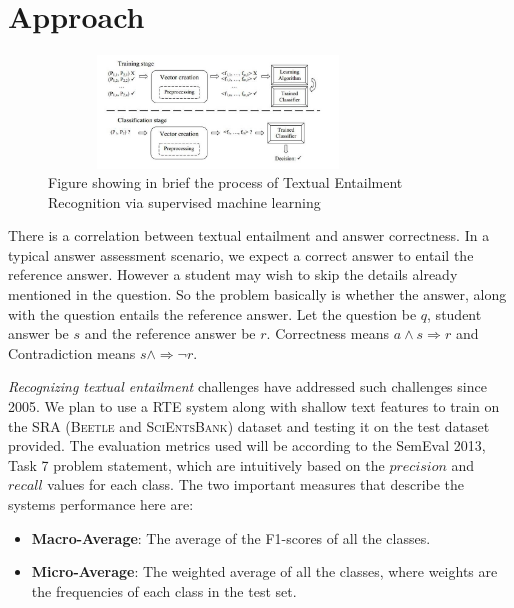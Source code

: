 \documentclass[a4paper]{article}
\begin{document}
\section{Approach}
\begin{figure}[htb]
\begin{minipage}[b]{1.1\linewidth}
  \centering
  \centerline{\includegraphics[width=9cm,height=3.0cm]{Picture1.jpg}}
  \vspace{-0.8cm}
  \centerline{}\medskip
\end{minipage}
\caption{Figure \cite {pic} showing in brief the process of Textual Entailment Recognition via supervised machine learning}
\label{fig1}
\end{figure}
There is a correlation between textual entailment and answer correctness. In a typical answer assessment scenario, we expect a correct answer to entail the reference answer. However a student may wish to skip the details already mentioned in the question. So the problem basically is whether the answer, along with the question entails the reference answer. 
Let the question be $q$, student answer be $s$ and the reference answer be $r$. Correctness means $a \wedge s\Rightarrow r$ and Contradiction means $s \wedge\Rightarrow \neg r$.

 \textit{Recognizing textual entailment} challenges have addressed such challenges since 2005\cite{rte}. We plan to use a RTE system along with shallow text features to train on the SRA (\textsc{Beetle} and \textsc{SciEntsBank}) dataset and testing it on the test dataset provided. The evaluation metrics used will be according to the SemEval 2013, Task 7 problem statement, which are intuitively based on the $precision$ and $recall$ values for each class. The two important measures that describe the systems performance here are:
\begin{itemize}
	\item \textbf{Macro-Average}: The average of the F1-scores of all the classes.
	\item \textbf{Micro-Average}: The weighted average of all the classes, where weights are the frequencies of each class in the test set.
\end{itemize}
\end{document}

